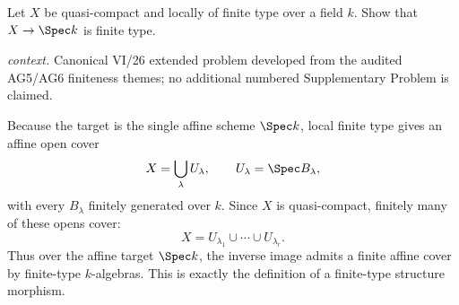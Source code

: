 \begin{problem}\label{prob:vi26-p12}
Let \(X\) be quasi-compact and locally of finite type over a field \(k\).  Show that \(X\to\Spec k\) is finite type.
\par\smallskip\noindent\textit{context.} Canonical VI/26 extended problem developed from the audited AG5/AG6 finiteness themes; no additional numbered Supplementary Problem is claimed.
\end{problem}

\ifdefined\FullProblemDossiers
\begin{solution}
Because the target is the single affine scheme \(\Spec k\), local finite type gives an affine open
cover
\[
X=\bigcup_{\lambda}U_\lambda,\qquad
U_\lambda=\Spec B_\lambda,
\]
with every \(B_\lambda\) finitely generated over \(k\).  Since \(X\) is quasi-compact, finitely many
of these opens cover:
\[
X=U_{\lambda_1}\cup\cdots\cup U_{\lambda_r}.
\]
Thus over the affine target \(\Spec k\), the inverse image admits a finite affine cover by
finite-type \(k\)-algebras.  This is exactly the definition of a finite-type structure morphism.
\end{solution}
\fi
